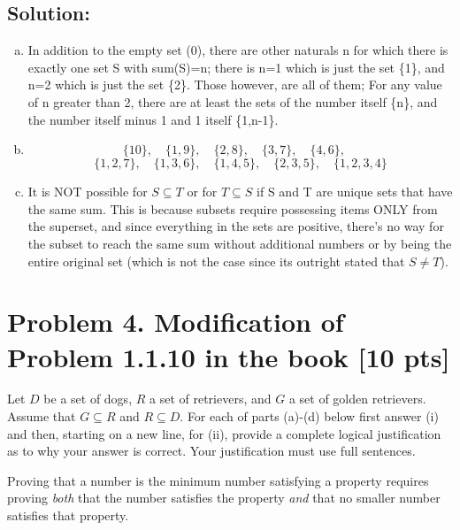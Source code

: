 \documentclass[12pt]{article}
\begin{document}
	\subsection*{\textbf{Solution:}}
	\begin{enumerate}[(a)]
		\item In addition to the empty set (0), there are other naturals n for which
			there is exactly one set S with sum(S)=n; there is n=1 which is just the
			set \{1\}, and n=2 which is just the set \{2\}. Those however, are all of them;
			For any value of n greater than 2, there are at least the sets of the number
			itself \{n\}, and the number itself minus 1 and 1 itself \{1,n-1\}.

		\item
			\[
				\{10\},\quad \{1,9\},\quad \{2,8\},\quad \{3,7\},\quad \{4,6\},\quad
			\]
			\[
				\{1,2,7\},\quad \{1,3,6\},\quad \{1,4,5\},\quad \{2,3,5\},\quad \{1,2,3,4
				\}
			\]

		\item It is NOT possible for $S \subseteq T$ or for $T \subseteq S$ if S and
			T are unique sets that have the same sum. This is because subsets require
			possessing items ONLY from the superset, and since everything in the sets are
			positive, there's no way for the subset to reach the same sum without
			additional numbers or by being the entire original set (which is not the case
			since its outright stated that $S \not= T$).
	\end{enumerate}

	\newpage
	\section*{\textbf{Problem 4. Modification of Problem 1.1.10 in the book} [10
	pts]}

	Let $D$ be a set of dogs, $R$ a set of retrievers, and $G$ a set of golden retrievers.
	Assume that $G \subseteq R$ and $R \subseteq D.$ For each of parts (a)-(d)
	below first answer (i) and then, starting on a new line, for (ii), provide a complete
	logical justification as to why your answer is correct. Your justification
	must use full sentences.

	Proving that a number is the minimum number satisfying a property requires
	proving {\em both} that the number satisfies the property {\em and} that no
	smaller number satisfies that property.
\end{document}
